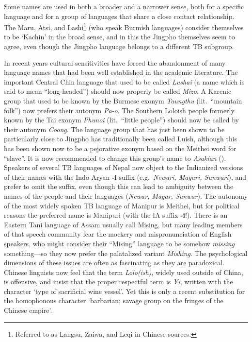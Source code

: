 Some names are used in both a broader and a narrower sense, both for a
specific language and for a group of languages that share a close contact
relationship. The Maru, Atsi, and Lashi\footnote{Referred to as Langsu, Zaiwa,
and Leqi in Chinese sources.} (who speak Burmish languages) consider themselves
to be ‘Kachin’ in the broad sense, and in this the Jingpho themselves seem to
agree, even though the Jingpho language belongs to a different TB subgroup.


In recent years cultural sensitivities have forced the abandonment of many
language names that had been well established in the academic literature. The
important Central Chin language that used to be called \textit{Lushai} (a name which is
said to mean “long-headed”) should now properly be called \textit{Mizo}.
A Karenic group
that used to be known by the Burmese exonym \textit{Taungthu} (lit.\ “mountain folk”) now
prefers their autonym \mbox{\textit{Pa-o}}. The Southern Loloish people
formerly known by the Tai exonym \textit{Phunoi} (lit.\ “little people”) should now be
called by their autonym \textit{Coong}. The language group that has just been shown to be particularly close to Jingpho has traditionally been called Luish, although this has been shown now to be a pejorative exonym based on the Meithei word for “slave”. It is now recommended to change this group’s name to \textit{Asakian} (\citealt{JAM-RGPJ}).
Speakers of several TB languages of Nepal now object to the Indianized versions of their names with the Indo-Aryan \textbf{-i} suffix
(e.g.\ \textit{Newari, Magari, Sunwari}), and prefer to omit the suffix, even though this
can lead to ambiguity between the names of the people and their languages
(\textit{Newar, Magar, Sunwar}). 
The autonomy of the most widely spoken TB language of Manipur is Meithei, but for political reasons the preferred name is Manipuri (with the IA suffix \textbf{-i}!).
There is an Eastern Tani language of Assam usually call Mising, but many leading members of that speech community fear the mockery and mispronunciation of English speakers, who might consider their “Mising” language to be somehow \textit{missing} something—so they now prefer the palatalized variant \textit{Mishing}. The psychological dimensions of these issues are often
as fascinating as they are paradoxical. Chinese linguists now feel that the
term \textit{Lolo(ish)}, widely used outside of China,
is offensive, and insist that the
proper respectful term is \textit{Yi}, written with the character  ‘type of
sacrificial wine vessel’. Yet this is only a recent substitution for the
homophonous character  ‘barbarian; savage group on the fringes of the Chinese
empire’.

